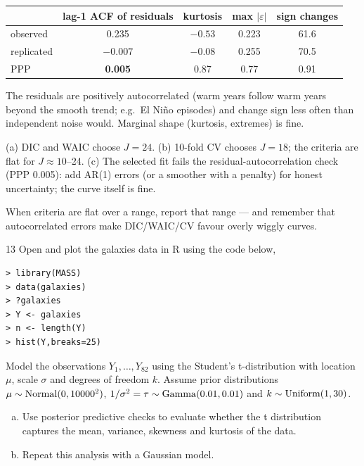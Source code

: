 \documentclass[11pt]{article}
\begin{document}
\begin{center}
\begin{tabular}{lcccc}\toprule
 & lag-1 ACF of residuals & kurtosis & max $|\varepsilon|$ & sign changes\\\midrule
observed & 0.235 & $-0.53$ & 0.223 & 61.6\\
replicated & $-0.007$ & $-0.08$ & 0.255 & 70.5\\
PPP & \textbf{0.005} & 0.87 & 0.77 & 0.91\\\bottomrule
\end{tabular}
\end{center}
The residuals are positively autocorrelated (warm years follow warm years beyond the smooth trend; e.g.\ El Ni\~no episodes) and change sign less often than independent noise would. Marginal shape (kurtosis, extremes) is fine.

\begin{answer}
(a) DIC and WAIC choose $J=24$. (b) 10-fold CV chooses $J=18$; the criteria are flat for $J\approx10$--24. (c) The selected fit fails the residual-autocorrelation check (PPP 0.005): add AR(1) errors (or a smoother with a penalty) for honest uncertainty; the curve itself is fine.
\end{answer}

\begin{takeaway}
When criteria are flat over a range, report that range --- and remember that autocorrelated errors make DIC/WAIC/CV favour overly wiggly curves.
\end{takeaway}


\begin{problem}{13}
Open and plot the galaxies data in R using the code below,
\begin{lstlisting}
> library(MASS)
> data(galaxies)
> ?galaxies
> Y <- galaxies
> n <- length(Y)
> hist(Y,breaks=25)
\end{lstlisting}
Model the observations $Y_1,\dots,Y_{82}$ using the Student's t-distribution with location $\mu$, scale $\sigma$ and degrees of freedom $k$. Assume prior distributions $\mu\sim\mathrm{Normal}(0,10000^2)$, $1/\sigma^2=\tau\sim\mathrm{Gamma}(0.01,0.01)$ and $k\sim\mathrm{Uniform}(1,30)$.
\begin{enumerate}[(a)]
\item Use posterior predictive checks to evaluate whether the t distribution captures the mean, variance, skewness and kurtosis of the data.
\item Repeat this analysis with a Gaussian model.
\end{enumerate}
\end{problem}
\end{document}
